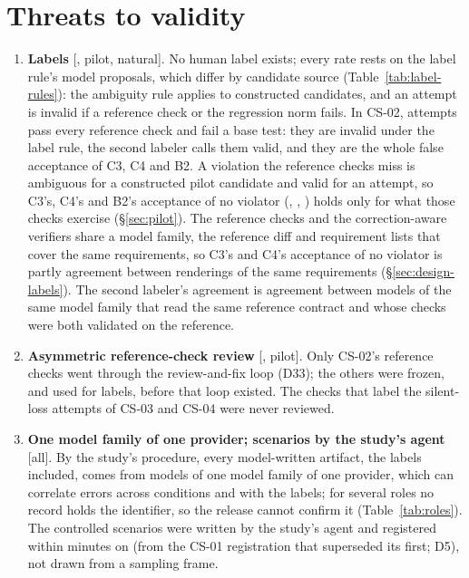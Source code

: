 \section{Threats to validity}
\label{sec:threats}
\begin{enumerate}
\item \textbf{Labels} [\texttt{\FRESHRUN}, pilot, natural]. No human label exists; every rate rests on the label rule's model proposals, which differ by candidate source (Table~\ref{tab:label-rules}): the ambiguity rule applies to constructed candidates, and an attempt is invalid if a reference check or the regression norm fails. In CS-02,  attempts pass every reference check and fail a base test: they are invalid under the label rule, the second labeler calls them valid, and they are the whole false acceptance of C3, C4 and B2. A violation the reference checks miss is ambiguous for a constructed pilot candidate and valid for an attempt, so C3's, C4's and B2's acceptance of no violator (, , ) holds only for what those checks exercise (\S\ref{sec:pilot}). The reference checks and the correction-aware verifiers share a model family, the reference diff and requirement lists that cover the same requirements, so C3's and C4's acceptance of no violator is partly agreement between renderings of the same requirements (\S\ref{sec:design-labels}). The second labeler's agreement is agreement between models of the same model family that read the same reference contract and whose checks were both validated on the reference.
\item \textbf{Asymmetric reference-check review} [\texttt{\FRESHRUN}, pilot]. Only CS-02's reference checks went through the review-and-fix loop (D33); the others were frozen, and used for labels, before that loop existed. The checks that label the silent-loss attempts of CS-03 and CS-04 were never reviewed.
\item \textbf{One model family of one provider; scenarios by the study's agent} [all]. By the study's procedure, every model-written artifact, the labels included, comes from models of one model family of one provider, which can correlate errors across conditions and with the labels; for several roles no record holds the identifier, so the release cannot confirm it (Table~\ref{tab:roles}). The  controlled scenarios were written by the study's agent and registered within  minutes on  (from the CS-01 registration that superseded its first; D5), not drawn from a sampling frame.

\end{enumerate}
